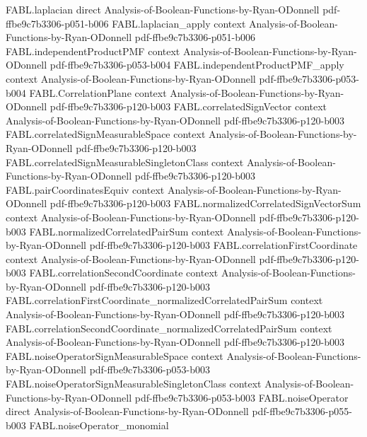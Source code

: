 \begin{theorem}
  {FABL.laplacian}
  {direct}
  {Analysis-of-Boolean-Functions-by-Ryan-ODonnell}
  {pdf-ffbe9c7b3306-p051-b006}
\proofstep
  {FABL.laplacian_apply}
  {context}
  {Analysis-of-Boolean-Functions-by-Ryan-ODonnell}
  {pdf-ffbe9c7b3306-p051-b006}
\proofstep
  {FABL.independentProductPMF}
  {context}
  {Analysis-of-Boolean-Functions-by-Ryan-ODonnell}
  {pdf-ffbe9c7b3306-p053-b004}
\proofstep
  {FABL.independentProductPMF_apply}
  {context}
  {Analysis-of-Boolean-Functions-by-Ryan-ODonnell}
  {pdf-ffbe9c7b3306-p053-b004}
\proofstep
  {FABL.CorrelationPlane}
  {context}
  {Analysis-of-Boolean-Functions-by-Ryan-ODonnell}
  {pdf-ffbe9c7b3306-p120-b003}
\proofstep
  {FABL.correlatedSignVector}
  {context}
  {Analysis-of-Boolean-Functions-by-Ryan-ODonnell}
  {pdf-ffbe9c7b3306-p120-b003}
\proofstep
  {FABL.correlatedSignMeasurableSpace}
  {context}
  {Analysis-of-Boolean-Functions-by-Ryan-ODonnell}
  {pdf-ffbe9c7b3306-p120-b003}
\proofstep
  {FABL.correlatedSignMeasurableSingletonClass}
  {context}
  {Analysis-of-Boolean-Functions-by-Ryan-ODonnell}
  {pdf-ffbe9c7b3306-p120-b003}
\proofstep
  {FABL.pairCoordinatesEquiv}
  {context}
  {Analysis-of-Boolean-Functions-by-Ryan-ODonnell}
  {pdf-ffbe9c7b3306-p120-b003}
\proofstep
  {FABL.normalizedCorrelatedSignVectorSum}
  {context}
  {Analysis-of-Boolean-Functions-by-Ryan-ODonnell}
  {pdf-ffbe9c7b3306-p120-b003}
\proofstep
  {FABL.normalizedCorrelatedPairSum}
  {context}
  {Analysis-of-Boolean-Functions-by-Ryan-ODonnell}
  {pdf-ffbe9c7b3306-p120-b003}
\proofstep
  {FABL.correlationFirstCoordinate}
  {context}
  {Analysis-of-Boolean-Functions-by-Ryan-ODonnell}
  {pdf-ffbe9c7b3306-p120-b003}
\proofstep
  {FABL.correlationSecondCoordinate}
  {context}
  {Analysis-of-Boolean-Functions-by-Ryan-ODonnell}
  {pdf-ffbe9c7b3306-p120-b003}
\proofstep
  {FABL.correlationFirstCoordinate_normalizedCorrelatedPairSum}
  {context}
  {Analysis-of-Boolean-Functions-by-Ryan-ODonnell}
  {pdf-ffbe9c7b3306-p120-b003}
\proofstep
  {FABL.correlationSecondCoordinate_normalizedCorrelatedPairSum}
  {context}
  {Analysis-of-Boolean-Functions-by-Ryan-ODonnell}
  {pdf-ffbe9c7b3306-p120-b003}
\proofstep
  {FABL.noiseOperatorSignMeasurableSpace}
  {context}
  {Analysis-of-Boolean-Functions-by-Ryan-ODonnell}
  {pdf-ffbe9c7b3306-p053-b003}
\proofstep
  {FABL.noiseOperatorSignMeasurableSingletonClass}
  {context}
  {Analysis-of-Boolean-Functions-by-Ryan-ODonnell}
  {pdf-ffbe9c7b3306-p053-b003}
\proofstep
  {FABL.noiseOperator}
  {direct}
  {Analysis-of-Boolean-Functions-by-Ryan-ODonnell}
  {pdf-ffbe9c7b3306-p055-b003}
\proofstep
  {FABL.noiseOperator_monomial}

\end{theorem}
